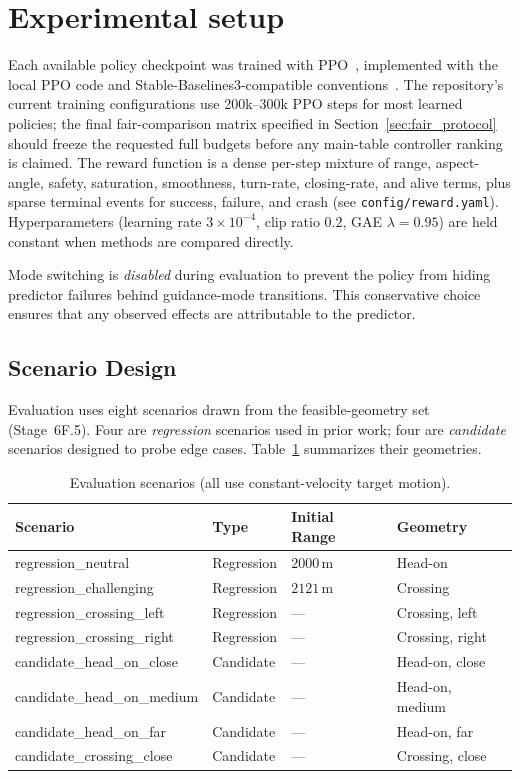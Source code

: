 \documentclass[conference]{IEEEtran}
\begin{document}
\section{Experimental setup}\label{sec:experimental_setup}

Each available policy checkpoint was trained with PPO~\cite{ppo}, implemented with the local PPO code and Stable-Baselines3-compatible conventions~\cite{sb3}. The repository's current training configurations use 200k--300k PPO steps for most learned policies; the final fair-comparison matrix specified in Section~\ref{sec:fair_protocol} should freeze the requested full budgets before any main-table controller ranking is claimed. The reward function is a dense per-step mixture of range, aspect-angle, safety, saturation, smoothness, turn-rate, closing-rate, and alive terms, plus sparse terminal events for success, failure, and crash (see \texttt{config/reward.yaml}). Hyperparameters (learning rate $3 \times 10^{-4}$, clip ratio $0.2$, GAE $\lambda = 0.95$) are held constant when methods are compared directly.

Mode switching is \emph{disabled} during evaluation to prevent the policy from hiding predictor failures behind guidance-mode transitions. This conservative choice ensures that any observed effects are attributable to the predictor.

\subsection{Scenario Design}

Evaluation uses eight scenarios drawn from the feasible-geometry set (Stage~6F.5). Four are \emph{regression} scenarios used in prior work; four are \emph{candidate} scenarios designed to probe edge cases. Table~\ref{tab:scenarios} summarizes their geometries.

\begin{table}[t]
\centering
\caption{Evaluation scenarios (all use constant-velocity target motion).}
\label{tab:scenarios}
\begin{tabular}{llll}
\toprule
Scenario & Type & Initial Range & Geometry \\
\midrule
regression\_neutral & Regression & $2000$\,m & Head-on \\
regression\_challenging & Regression & $2121$\,m & Crossing \\
regression\_crossing\_left & Regression & --- & Crossing, left \\
regression\_crossing\_right & Regression & --- & Crossing, right \\
candidate\_head\_on\_close & Candidate & --- & Head-on, close \\
candidate\_head\_on\_medium & Candidate & --- & Head-on, medium \\
candidate\_head\_on\_far & Candidate & --- & Head-on, far \\
candidate\_crossing\_close & Candidate & --- & Crossing, close \\
\bottomrule
\end{tabular}
\end{table}
\end{document}
